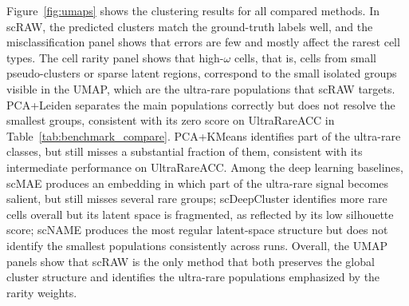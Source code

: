\documentclass[11pt,a4paper]{article}
\begin{document}
Figure~\ref{fig:umaps} shows the clustering results for all compared methods. In scRAW, the predicted clusters match the ground-truth labels well, and the misclassification panel shows that errors are few and mostly affect the rarest cell types. The cell rarity panel shows that high-$\omega$ cells, that is, cells from small pseudo-clusters or sparse latent regions, correspond to the small isolated groups visible in the UMAP, which are the ultra-rare populations that scRAW targets. PCA+Leiden separates the main populations correctly but does not resolve the smallest groups, consistent with its zero score on UltraRareACC in Table~\ref{tab:benchmark_compare}. PCA+KMeans identifies part of the ultra-rare classes, but still misses a substantial fraction of them, consistent with its intermediate performance on UltraRareACC. Among the deep learning baselines, scMAE produces an embedding in which part of the ultra-rare signal becomes salient, but still misses several rare groups; scDeepCluster identifies more rare cells overall but its latent space is fragmented, as reflected by its low silhouette score; scNAME produces the most regular latent-space structure but does not identify the smallest populations consistently across runs. Overall, the UMAP panels show that scRAW is the only method that both preserves the global cluster structure and identifies the ultra-rare populations emphasized by the rarity weights.


\end{document}
